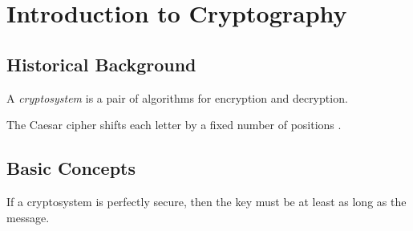 \chapter{Introduction to Cryptography}
\section{Historical Background}
\begin{definition}
A \emph{cryptosystem} is a pair of algorithms for encryption and decryption.
\end{definition}

\begin{example}
The Caesar cipher shifts each letter by a fixed number of positions \cite{tex}.
\end{example}

\section{Basic Concepts}
\begin{theorem}
If a cryptosystem is perfectly secure, then the key must be at least as long as the message.
\end{theorem}


\printbibliography[heading=subbibliography]